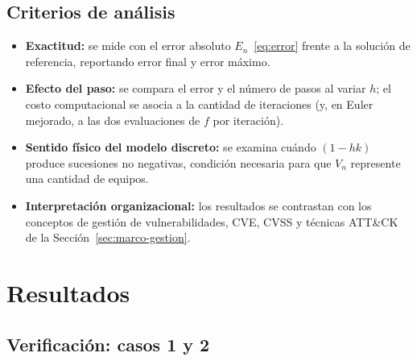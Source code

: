 \documentclass[11pt,a4paper]{article}
\begin{document}
\subsection{Criterios de análisis}

\begin{itemize}
  \item \textbf{Exactitud:} se mide con el error absoluto
        $E_n$~\eqref{eq:error} frente a la solución de referencia, reportando
        error final y error máximo.
  \item \textbf{Efecto del paso:} se compara el error y el número de pasos
        al variar $h$; el costo computacional se asocia a la cantidad de
        iteraciones (y, en Euler mejorado, a las dos evaluaciones de $f$ por
        iteración).
  \item \textbf{Sentido físico del modelo discreto:} se examina cuándo
        $(1-hk)$ produce sucesiones no negativas, condición necesaria para
        que $V_n$ represente una cantidad de equipos.
  \item \textbf{Interpretación organizacional:} los resultados se contrastan
        con los conceptos de gestión de vulnerabilidades, CVE, CVSS y técnicas
        ATT\&CK de la Sección~\ref{sec:marco-gestion}.
\end{itemize}

\section{Resultados}
\label{sec:resultados}
%

\subsection{Verificación: casos 1 y 2}

\end{document}

